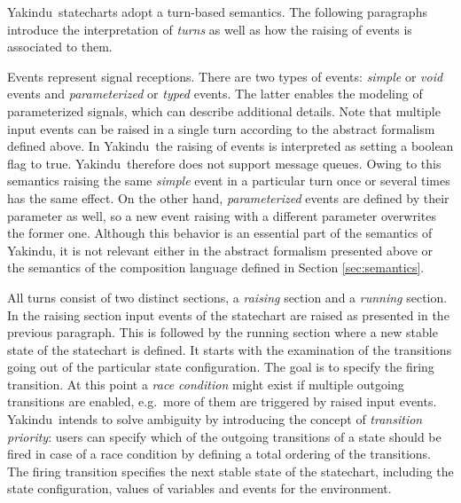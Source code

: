 \documentclass[conference]{IEEEtran}
\newcommand{\Yakindu}{\textsf{Yakindu}}
\begin{document}
 \Yakindu\ statecharts adopt a turn-based semantics. 
 The following paragraphs introduce the interpretation of \emph{turns} as well as how the raising of events is associated to them.
 
 Events represent signal receptions. There are two types of events: \emph{simple} or \emph{void} events and \emph{parameterized} or \emph{typed} events. The latter enables the modeling of parameterized signals, which can describe additional details. Note that multiple input events can be raised in a single turn according to the abstract formalism defined above. In \Yakindu\ the raising of events is interpreted as setting a boolean flag to true. \Yakindu\ therefore does not support message queues. Owing to this semantics raising the same \emph{simple} event in a particular turn once or several times has the same effect. On the other hand, \emph{parameterized} events are defined by their parameter as well, so a new event raising with a different parameter overwrites the former one. Although this behavior is an essential part of the semantics of \Yakindu, it is not relevant either in the abstract formalism presented above or the semantics of the composition language defined in Section \ref{sec:semantics}.

 All turns consist of two distinct sections, a \emph{raising} section and a \emph{running} section. In the raising section input events of the statechart are raised as presented in the previous paragraph. This is followed by the running section where a new stable state of the statechart is defined. It starts with the examination of the transitions going out of the particular state configuration. The goal is to specify the firing transition. At this point a \emph{race condition} might exist if multiple outgoing transitions are enabled, e.g.~more of them are triggered by raised input events. \Yakindu\ intends to solve ambiguity by introducing the concept of \emph{transition priority}: users can specify which of the outgoing transitions of a state should be fired in case of a race condition by defining a total ordering of the transitions. The firing transition specifies the next stable state of the statechart, including the state configuration, values of variables and events for the environment.
 
\end{document}
